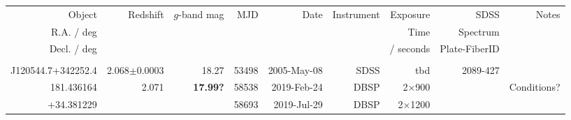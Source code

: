 \documentclass[a4paper,fleqn,usenatbib]{mnras}
\begin{document}
\begin{table}
  \centering
  \begin{tabular}{r  r  r r r   r r r r}
    \hline 
    \hline 
    Object                         & \multirow{3}{*}{Redshift} & \multirow{3}{*}{$g$-band mag}      & \multirow{3}{*}{MJD} & \multirow{3}{*}{Date}  & \multirow{3}{*}{Instrument}  & Exposure      & SDSS                        & \multirow{3}{*}{Notes} \\
    R.A. / deg                   &                                         &                                                          &                                 &                                   &                                               &  Time           & Spectrum                 & \\
    Decl. / deg                 &                                         &                                                          &                                &                                     &                                              &  / seconds    & Plate-FiberID  & \\
    \hline 
                                   &                                          &                        &             &                            &                    &                             &                              & \\
    J120544.7+342252.4  & 2.068$\pm$0.0003          &   18.27             & 53498  &  2005-May-08   & SDSS             & tbd                          & 2089-427             & \\
    181.436164          & 2.071                               & {\bf 17.99?}   & 58538  &  2019-Feb-24    & DBSP            &  2$\times$900    &                               &  Conditions? \\
    +34.381229           &                                        &                          & 58693  &  2019-Jul-29     & DBSP            &  2$\times$1200   &                              &   \\

\end{tabular}
\end{table}
\end{document}
